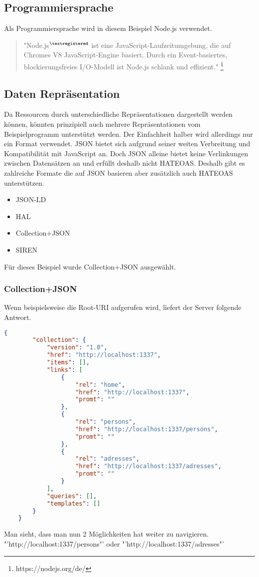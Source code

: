 \documentclass[listof=totoc]{article}
\begin{document}
	\subsection{Programmiersprache}
	Als Programmiersprache wird in diesem Beispiel Node.js verwendet.
	\begin{quote}
		"Node.js$^{\tiny{\textregistered}}$ ist eine JavaScript-Laufzeitumgebung, die auf Chromes V8 JavaScript-Engine basiert. Durch ein Event-basiertes, blockierungsfreies I/O-Modell ist Node.js schlank und effizient."
		\footnote{https://nodejs.org/de/}
	\end{quote}
	\subsection{Daten Repräsentation}
	Da Ressourcen durch unterschiedliche Repräsentationen dargestellt werden können, könnten prinzipiell auch mehrere Repräsentationen vom Beispielprogramm unterstützt werden. Der Einfachheit halber wird allerdings nur ein Format verwendet.
	\ac{JSON} bietet sich aufgrund seiner weiten Verbreitung und Kompatibilität mit JavaScript an. Doch \ac{JSON} alleine bietet keine Verlinkungen zwischen Datensätzen an und erfüllt deshalb nicht \ac{HATEOAS}. Deshalb gibt es zahlreiche Formate die auf \ac{JSON} basieren aber zusätzlich auch \ac{HATEOAS} unterstützen. \cite{HATEOAS_FORMATS}
	\begin{itemize} 
		\setlength{\itemsep}{0pt} 
		\item \ac{JSON-LD}
		\item \ac{HAL}
		\item Collection+\ac{JSON}
		\item \ac{SIREN}
	\end{itemize}
	Für dieses Beispiel wurde Collection+\ac{JSON} ausgewählt.
		\newpage
	\subsubsection{Collection+\ac{JSON}}
	Wenn beispielsweise die Root-\ac{URI} aufgerufen wird, liefert der Server folgende Antwort. 
	\begin{lstlisting}[language=json,caption=Collection+\ac{JSON}-Repräsentation (application/vnd.collection+json)]
	{
		"collection": {
			"version": "1.0",
			"href": "http://localhost:1337",
			"items": [],
			"links": [
				{
					"rel": "home",
					"href": "http://localhost:1337",
					"promt": ""
				},
				{
					"rel": "persons",
					"href": "http://localhost:1337/persons",
					"promt": ""
				},
				{
					"rel": "adresses",
					"href": "http://localhost:1337/adresses",
					"promt": ""
				}
			],
			"queries": [],
			"templates": []
		}
	}
	\end{lstlisting}
	Man sieht, dass man nun 2 Möglichkeiten hat weiter zu navigieren.
	\newline
	"'http://localhost:1337/persons"' oder "'http://localhost:1337/adresses"'
	
\end{document}
